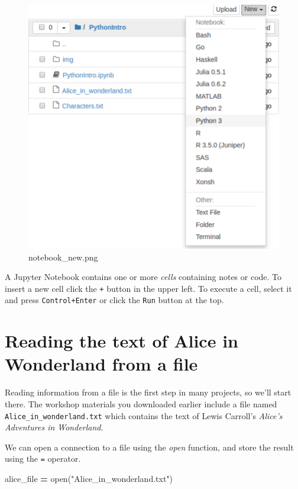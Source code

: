 \documentclass[]{book}
\newenvironment{Shaded}{\begin{snugshade}}{\end{snugshade}}
\newcommand{\StringTok}[1]{\textcolor[rgb]{0.31,0.60,0.02}{#1}}
\newcommand{\OperatorTok}[1]{\textcolor[rgb]{0.81,0.36,0.00}{\textbf{#1}}}
\newcommand{\BuiltInTok}[1]{#1}
\newcommand{\NormalTok}[1]{#1}
\begin{document}
\begin{figure}
\centering
\includegraphics{Python/PythonIntro/images/notebook_new.png}
\caption{notebook\_new.png}
\end{figure}

A Jupyter Notebook contains one or more \emph{cells} containing notes or
code. To insert a new cell click the \texttt{+} button in the upper
left. To execute a cell, select it and press \texttt{Control+Enter} or
click the \texttt{Run} button at the top.

\section{Reading the text of Alice in Wonderland from a
file}\label{reading-the-text-of-alice-in-wonderland-from-a-file}

Reading information from a file is the first step in many projects, so
we'll start there. The workshop materials you downloaded earlier include
a file named \texttt{Alice\_in\_wonderland.txt} which contains the text
of Lewis Carroll's \emph{Alice's Adventures in Wonderland}.

We can open a connection to a file using the \emph{open} function, and
store the result using the \texttt{=} operator.

\begin{Shaded}
\begin{Highlighting}[]
\NormalTok{alice_file }\OperatorTok{=} \BuiltInTok{open}\NormalTok{(}\StringTok{"Alice_in_wonderland.txt"}\NormalTok{)}
\end{Highlighting}
\end{Shaded}
\end{document}
